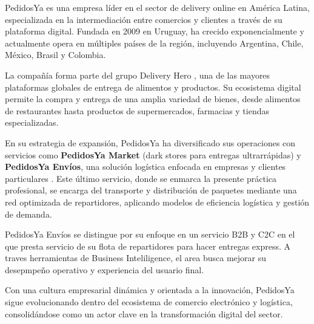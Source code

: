 PedidosYa es una empresa líder en el sector de delivery online en América Latina, especializada en la intermediación entre comercios y clientes a través de su plataforma digital. Fundada en 2009 en Uruguay, ha crecido exponencialmente y actualmente opera en múltiples países de la región, incluyendo Argentina, Chile, México, Brasil y Colombia.

La compañía forma parte del grupo Delivery Hero \parencite{deliveryhero_pedidosya2025}, una de las mayores plataformas globales de entrega de alimentos y productos. Su ecosistema digital permite la compra y entrega de una amplia variedad de bienes, desde alimentos de restaurantes hasta productos de supermercados, farmacias y tiendas especializadas.

En su estrategia de expansión, PedidosYa ha diversificado sus operaciones con servicios como \textbf{PedidosYa Market} (dark stores para entregas ultrarrápidas) y \textbf{PedidosYa Envíos}, una solución logística enfocada en empresas y clientes particulares \parencite{pedidosya_envios}. Este último servicio, donde se enmarca la presente práctica profesional, se encarga del transporte y distribución de paquetes mediante una red optimizada de repartidores, aplicando modelos de eficiencia logística y gestión de demanda.

PedidosYa Envíos se distingue por su enfoque en un servicio B2B y C2C en el que presta servicio de su flota de repartidores para hacer entregas express. A traves herramientas de Business Inteliligence, el area busca mejorar su desepmpeño operativo y experiencia del usuario final.

Con una cultura empresarial dinámica y orientada a la innovación, PedidosYa sigue evolucionando dentro del ecosistema de comercio electrónico y logística, consolidándose como un actor clave en la transformación digital del sector.
